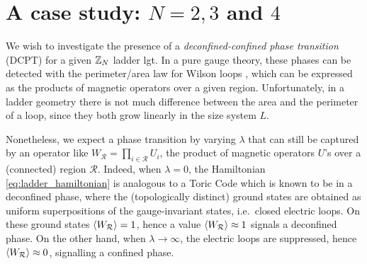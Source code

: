 \section{A case study: \texorpdfstring{$N=2, 3$}{N=2, 3} and \texorpdfstring{$4$}{4}}
\label{sec:a_case_study_N_2_3_4}

\newcommand{\ZTwoWilsonGraph}[1]{
        \nextgroupplot
        \addplot+[thick] table [y=10x2] {assets/graphs/data/Z2_wilson_#1.csv};
        \addplot+[thick] table [y=12x2] {assets/graphs/data/Z2_wilson_#1.csv};
        \addplot+[thick] table [y=14x2] {assets/graphs/data/Z2_wilson_#1.csv};
        \addplot+[thick] table [y=16x2] {assets/graphs/data/Z2_wilson_#1.csv};
        \addplot+[thick] table [y=18x2] {assets/graphs/data/Z2_wilson_#1.csv};
}
\newcommand{\ZThreeWilsonGraph}[1]{
        \nextgroupplot
        \addplot+[thick] table [y=7x2]  {assets/graphs/data/Z3_wilson_#1.csv};
        \addplot+[thick] table [y=9x2]  {assets/graphs/data/Z3_wilson_#1.csv};
        \addplot+[thick] table [y=11x2] {assets/graphs/data/Z3_wilson_#1.csv};
        \addplot+[thick] table [y=13x2] {assets/graphs/data/Z3_wilson_#1.csv};
}
\newcommand{\ZFourWilsonGraph}[1]{
    \nextgroupplot
    \addplot+ [thick] table [y=6x2]  {assets/graphs/data/Z4_wilson_#1.csv};
    \addplot+ [thick] table [y=8x2]  {assets/graphs/data/Z4_wilson_#1.csv};
    \addplot+ [thick] table [y=10x2] {assets/graphs/data/Z4_wilson_#1.csv};
}









We wish to investigate the presence of a \emph{deconfined-confined phase transition} (DCPT) for a given $\mathbb{Z}_N$ ladder \ac{lgt}.
In a pure gauge theory, these phases can be detected
with the perimeter/area law for Wilson loops \cite{wilson1974confinement},
which can be expressed as the products of magnetic operators over a given region.
Unfortunately, in a  ladder geometry there is not much difference between the area and the perimeter of a loop, since they both grow linearly in the size system $L$.

Nonetheless, we expect a phase transition by varying $\lambda$ \cite{trebst2007topological, hamma2008adiabatic, tagliacozzo2011entanglement} that can still be captured by an operator like $W_{\mathcal{R}}= \prod_{i \in \mathcal{R}} U_{i}$, the product of magnetic operators $U$'s over a (connected) region $\mathcal{R}$.
Indeed, when $\lambda=0$, the Hamiltonian \eqref{eq:ladder_hamiltonian} is analogous to a Toric Code \cite{kitaev2003fault} which is known to be in a deconfined phase, where the (topologically distinct) ground states are obtained as uniform superpositions of the gauge-invariant states, i.e.~closed electric loops.
On these ground states $\ev{W_{\mathcal{R}}} = 1$, hence
 a value $\ev{W_{\mathcal{R}}} \approx 1$ signals a deconfined phase.
On the other hand, when $\lambda \rightarrow \infty$, the electric loops are suppressed, hence
$\ev{W_{\mathcal{R}}} \approx 0$, signalling a confined phase.

